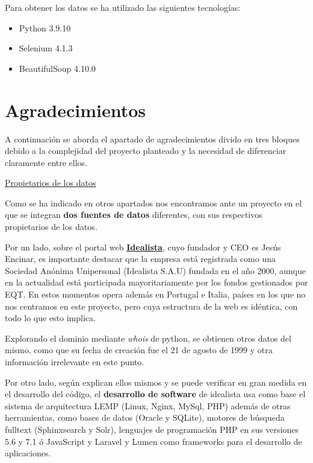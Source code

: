 \documentclass[12pt]{article}
\begin{document}
Para obtener los datos se ha utilizado las siguientes tecnologías:

\begin{multicols}{3}
	\begin{itemize}[topsep=0cm,partopsep=0cm,wide]
		\item Python 3.9.10
		\item Selenium 4.1.3
		\item BeautifulSoup 4.10.0
	\end{itemize}
\end{multicols}

\vspace{-1.5em}\section{Agradecimientos}\vspace{-1.5em}

A continuación se aborda el apartado de agradecimientos divido en tres bloques debido a la complejidad del proyecto planteado y la necesidad de diferenciar claramente entre ellos.

\underline{Propietarios de los datos}

Como se ha indicado en otros apartados nos encontramos ante un proyecto en el que se integran \textbf{dos fuentes de datos} diferentes, con sus respectivos propietarios de los datos. 

Por un lado, sobre el portal web \href{http://www.idealista.com}{\textbf{\underline{Idealista}}}, cuyo fundador y CEO es Jesús Encinar, es importante destacar que la empresa está registrada como una Sociedad Anónima Unipersonal (Idealista S.A.U) fundada en el año 2000, aunque en la actualidad está participada mayoritariamente por los fondos gestionados por EQT. En estos momentos opera además en Portugal e Italia, países en los que no nos centramos en este proyecto, pero cuya estructura de la web es idéntica, con todo lo que esto implica. 

Explorando el dominio mediante \textit{whois} de python, se obtienen otros datos del mismo, como que su fecha de creación fue el 21 de agosto de 1999 y otra información irrelevante en este punto. 

Por otro lado, según explican ellos mismos y se puede verificar en gran medida en el desarrollo del código, el \textbf{desarrollo de software }de idealista usa como base el sistema de arquitectura LEMP (Linux, Nginx, MySql, PHP) además de otras herramientas, como bases de datos (Oracle y SQLite), motores de búsqueda fulltext (Sphinxsearch y Solr), lenguajes de programación PHP en sus versiones 5.6 y 7.1 ó JavaScript y Laravel y Lumen como frameworks para el desarrollo de aplicaciones.
\end{document}
